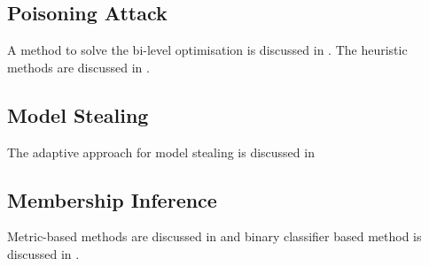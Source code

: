 \newpage 
{}


\subsection*{Poisoning Attack} A method to solve the bi-level optimisation is discussed in \cite{236234}. The heuristic methods are discussed in \cite{10.5555/3327345.3327509,pmlr-v97-zhu19a,DBLP:conf/aaai/SahaSP20}. 

\subsection*{Model Stealing} The adaptive approach for model stealing is discussed in \cite{DBLP:conf/ijcnn/SilvaBBSO18, DBLP:conf/cvpr/OrekondySF19}

\subsection*{Membership Inference}

Metric-based methods are discussed in \cite{8429311,DBLP:conf/ndss/Salem0HBF019} and binary classifier based method is discussed in \cite{DBLP:conf/sp/ShokriSSS17}. 